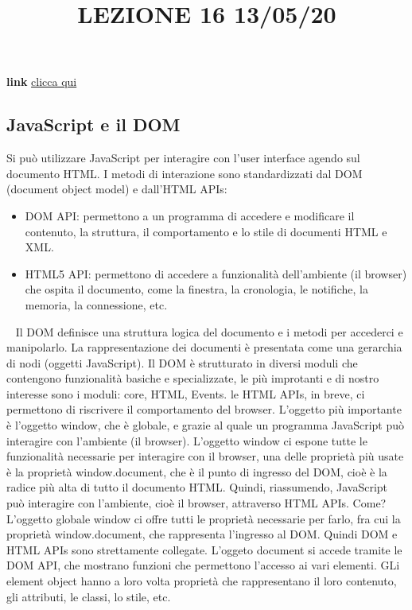 \title{LEZIONE 16 13/05/20}
\textbf{link} \href{https://web.microsoftstream.com/video/5539d88f-c229-4790-acbc-d3ce4660da70?list=user&userId=cfe0965d-9a7c-40e2-be6e-f078296a1914}{clicca qui}
\subsection{JavaScript e il DOM}
Si può utilizzare JavaScript per interagire con l'user interface agendo sul documento HTML.\newline
\newline
I metodi di interazione sono standardizzati dal DOM (document object model) e dall'HTML APIs:
\begin{itemize}
    \item DOM API: permettono a un programma di accedere e modificare il contenuto, la struttura, il comportamento e lo stile di documenti HTML e XML.
    \item HTML5 API: permettono di accedere a funzionalità dell'ambiente (il browser) che ospita il documento, come la finestra, la cronologia, le notifiche, la memoria, la connessione, etc.
\end{itemize}
\ \newline
Il DOM definisce una struttura logica del documento e i metodi per accederci e manipolarlo.\newline
La rappresentazione dei documenti è presentata come una gerarchia di nodi (oggetti JavaScript).\newline
Il DOM è strutturato in diversi moduli che contengono funzionalità basiche e specializzate, le più improtanti e di nostro interesse sono i moduli: core, HTML, Events.\newline
\newline
le HTML APIs, in breve, ci permettono di riscrivere il comportamento del browser.\newline
L'oggetto più importante è l'oggetto window, che è globale, e grazie al quale un programma JavaScript può interagire con l'ambiente (il browser). L'oggetto window ci espone tutte le funzionalità necessarie per interagire con il browser, una delle proprietà più usate è la proprietà window.document, che è il punto di ingresso del DOM, cioè è la radice più alta di tutto il documento HTML.\newline
\newline
Quindi, riassumendo, JavaScript può interagire con l'ambiente, cioè il browser, attraverso HTML APIs. Come? L'oggetto globale window ci offre tutti le proprietà necessarie per farlo, fra cui la proprietà window.document, che rappresenta l'ingresso al DOM. Quindi DOM e HTML APIs sono strettamente collegate. L'oggeto document si accede tramite le DOM API, che mostrano funzioni che permettono l'accesso ai vari elementi. GLi element object hanno a loro volta proprietà che rappresentano il loro contenuto, gli attributi, le classi, lo stile, etc.\newline
